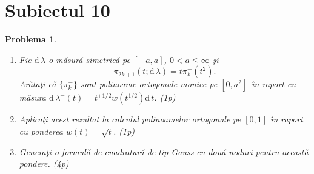 \documentclass[a4paper]{article}%
\newtheorem{problem}[theorem]{Problema}
\begin{document}
\section*{Subiectul 10}

\begin{problem}
\label{pb4.35b}

\begin{enumerate}
\item[(a)] Fie $\mathrm{d\,}\lambda$ o m\u{a}sur\u{a} simetric\u{a} pe
$[-a,a]$, $0<a\leq\infty$ \c{s}i
\[
\pi_{2k+1}(t;\mathrm{d\,}\lambda)=t\pi_{k}^{-}(t^{2}).
\]
Ar\u{a}ta\c{t}i c\u{a} $\{\pi_{k}^{-}\}$ sunt polinoame ortogonale monice pe
$[0,a^{2}]$\ \^{\i}n raport cu m\u{a}sura $\mathrm{d\,}\lambda^{-}%
(t)=t^{+1/2}w(t^{1/2})\mathrm{d\,}t$. (1p)

\item[(b)] Aplica\c{t}i acest rezultat la calculul polinoamelor ortogonale pe
$[0,1]$ \^{\i}n raport cu ponderea $w(t)=\sqrt{t}$. (1p)

\item[(c)] Genera\c{t}i o formul\u{a} de cuadratur\u{a} de tip Gauss cu
dou\u{a} noduri pentru aceast\u{a} pondere. (4p)
\end{enumerate}
\end{problem}
\end{document}
